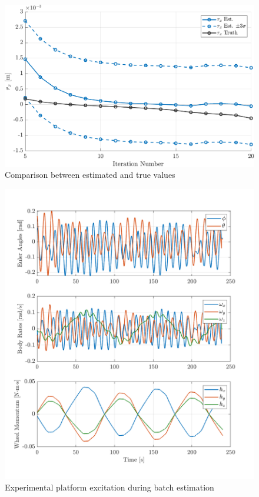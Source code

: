 \begin{figure}[p]
    \centering
    \includegraphics[width=\linewidth]{plots/LSR_sim_confidence_1_wheel.pdf}
    \caption{Comparison between estimated and true values}
    \label{fig:LSR_sim_confidence_1_wheel}
\end{figure}

\begin{figure}[p]
    \centering
    \includegraphics[width=\linewidth]{plots/LSR_hardware_excitation.png}
    \caption{Experimental platform excitation during batch estimation}
    \label{fig:LSR_hardware_excitation}
\end{figure}


